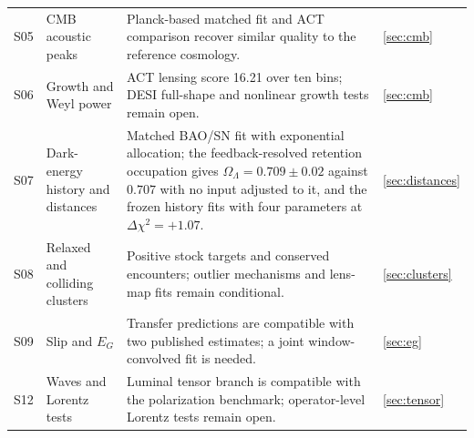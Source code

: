 \begin{longtable}{@{}p{}p{}p{}p{}@{}}
S05 & CMB acoustic peaks & Planck-based matched fit and ACT comparison recover similar quality to the reference cosmology. & \ref{sec:cmb}\\
S06 & Growth and Weyl power & ACT lensing score 16.21 over ten bins; DESI full-shape and nonlinear growth tests remain open. & \ref{sec:cmb}\\
S07 & Dark-energy history and distances & Matched BAO/SN fit with exponential allocation; the feedback-resolved retention occupation gives $\Omega_\Lambda=0.709\pm0.02$ against $0.707$ with no input adjusted to it, and the frozen history fits with four parameters at $\Delta\chi^2=+1.07$. & \ref{sec:distances}\\
S08 & Relaxed and colliding clusters & Positive stock targets and conserved encounters; outlier mechanisms and lens-map fits remain conditional. & \ref{sec:clusters}\\
S09 & Slip and $E_G$ & Transfer predictions are compatible with two published estimates; a joint window-convolved fit is needed. & \ref{sec:eg}\\
S12 & Waves and Lorentz tests & Luminal tensor branch is compatible with the polarization benchmark; operator-level Lorentz tests remain open. & \ref{sec:tensor}\\
\bottomrule
\end{longtable}
\endgroup
{}

